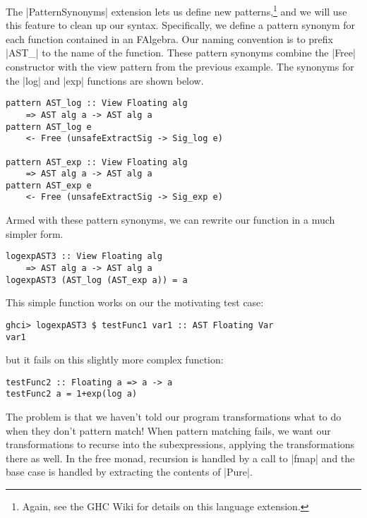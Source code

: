 \documentclass[preprint]{sigplanconf}
\theoremstyle{definition}
\begin{document}
The |PatternSynonyms| extension lets us define new patterns,\footnote{
    Again, see the GHC Wiki \cite{patternsynonyms} for details on this language extension.
}
and we will use this feature to clean up our syntax.
Specifically, we define a pattern synonym for each function contained in an FAlgebra.
Our naming convention is to prefix |AST_| to the name of the function.
These pattern synonyms combine the |Free| constructor with the view pattern from the previous example.
The synonyms for the |log| and |exp| functions are shown below.
\begin{lstlisting}
pattern AST_log :: View Floating alg
    => AST alg a -> AST alg a
pattern AST_log e
    <- Free (unsafeExtractSig -> Sig_log e)

pattern AST_exp :: View Floating alg
    => AST alg a -> AST alg a
pattern AST_exp e
    <- Free (unsafeExtractSig -> Sig_exp e)
\end{lstlisting}
Armed with these pattern synonyms,
we can rewrite our function in a much simpler form.
\begin{lstlisting}
logexpAST3 :: View Floating alg
    => AST alg a -> AST alg a
logexpAST3 (AST_log (AST_exp a)) = a
\end{lstlisting}
This simple function works on our the motivating test case:
\begin{lstlisting}
ghci> logexpAST3 $ testFunc1 var1 :: AST Floating Var
var1
\end{lstlisting}
but it fails on this slightly more complex function:
\begin{lstlisting}
testFunc2 :: Floating a => a -> a
testFunc2 a = 1+exp(log a)
\end{lstlisting}
The problem is that we haven't told our program transformations what to do when they don't pattern match!
When pattern matching fails, we want our transformations to recurse into the subexpressions,
applying the transformations there as well.
In the free monad, recursion is handled by a call to |fmap| and the base case is handled by extracting the contents of |Pure|.
\end{document}
